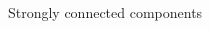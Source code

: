 \begin{minipage}[t]{\textwidth}
    \begin{columns}
        \begin{column}{0.5\textwidth}
            \begin{columns}
                \begin{column}{0.6\textwidth}
                    \begin{flushright}
                        \resizebox{0.9\textwidth}{!}{}
                    \end{flushright}
                \end{column}
                \begin{column}{0.4\textwidth}
                    Strongly connected components
                \end{column}
            \end{columns}
        \end{column}
        \hfill
        \begin{column}{0.5\textwidth}
        \end{column}
    \end{columns}
\end{minipage}